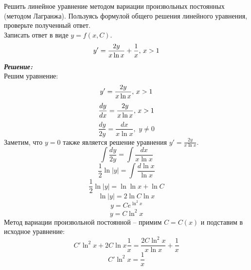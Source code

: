 \documentclass[a5paper, 10pt]{article}
\theoremstyle{definition}
\theoremstyle{plain}
\theoremstyle{remark}
\begin{document}
\newpage
\section{}
Решить линейное уравнение методом вариации произвольных постоянных (методом Лагранжа). Пользуясь формулой общего решения линейного уравнения, проверьте полученный ответ.\\
Записать ответ в виде $y = f(x, C).$
\begin{equation*}
y' = \frac{2y}{x \ln x} + \frac{1}{x}, \, x > 1\\
\end{equation*}
\textit{\textbf{Решение:}}\\
Решим уравнение:
\begin{equation*}
y' = \frac{2y}{x \ln x}, \, x > 1\\
\end{equation*}
\begin{equation*}
\frac{dy}{dx} = \frac{2y}{x \ln x}, \, x > 1\\
\end{equation*}
\begin{equation*}
\frac{dy}{2y} = \frac{dx}{x \ln x}, \, \, y \neq 0
\end{equation*}
Заметим, что $y = 0$ также является решение уравнения $y' = \frac{2y}{x \ln x}$.
\begin{equation*}
 \int \frac{dy}{2y} = \int \frac{dx}{x \ln x}
\end{equation*}
\begin{equation*}
  \frac{1}{2} \ln |y| = \int \frac{d \ln x}{\ln x}
\end{equation*}
\begin{equation*}
  \frac{1}{2} \ln |y| = \ln \ln x + \ln C
\end{equation*}
\begin{equation*}
  \ln |y| =2 \ln C \ln x
\end{equation*}
\begin{equation*}
  y = C e^{ \ln ^2 x}
\end{equation*}
\begin{equation*}
  y = C  \ln ^2 x
\end{equation*}
Метод вариации произвольной постоянной -- примим $C = C(x)$ и подставим в исходное уравнение:
\begin{equation*}
C' \ln ^2 x + 2C \ln x \frac{1}{x}= \frac{2 C  \ln ^2 x}{x \ln x} + \frac{1}{x}
\end{equation*}
\begin{equation*}
C' \ln ^2 x =  \frac{1}{x}
\end{equation*}
\end{document}
